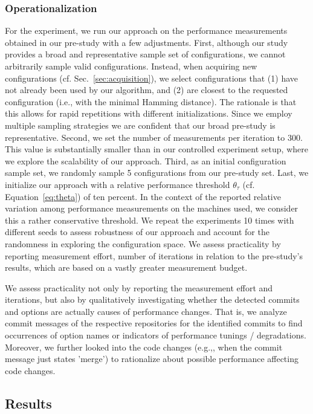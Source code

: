 \documentclass[sigconf]{acmart}
\begin{document}
	\subsubsection{Operationalization}
	For the experiment, we run our approach on the performance measurements obtained in our pre-study with a few adjustments.
	First, although our study provides a broad and representative sample set of configurations, we cannot arbitrarily sample valid configurations. Instead, when acquiring new configurations (cf. Sec.~\ref{sec:acquisition}), we select configurations that (1) have not already been used by our algorithm, and (2) are closest to the requested configuration (i.e., with the minimal Hamming distance). The rationale is that this allows for rapid repetitions with different initializations. Since we employ multiple sampling strategies we are confident that our broad pre-study is representative. Second, we set the number of measurements per iteration to 300. This value is substantially smaller than in our controlled experiment setup, where we explore the scalability of our approach. Third, as an initial configuration sample set, we randomly sample 5 configurations from our pre-study set. 
	Last, we initialize our approach with a relative performance threshold $\theta_\tau$ (cf. Equation~\ref{eq:theta}) of ten percent. In the context of the reported relative variation among performance measurements on the machines used, we consider this a rather conservative threshold. 
	We repeat the experiments 10 times with different seeds to assess robustness of our approach and account for the randomness in exploring the configuration space.
	We assess practicality by reporting measurement effort, number of iterations in relation to the pre-study's results, which are based on a vastly greater measurement budget.
	
	We assess practicality not only by reporting the measurement effort and iterations, but also by qualitatively investigating whether the detected commits and options are actually causes of performance changes. That is, we analyze commit messages of the respective repositories for the identified commits to find occurrences of option names or indicators of performance tunings / degradations. Moreover, we further looked into the code changes (e.g.,, when the commit message just states 'merge') to rationalize about possible performance affecting code changes.
	
	\subsection{Results}	
\end{document}
